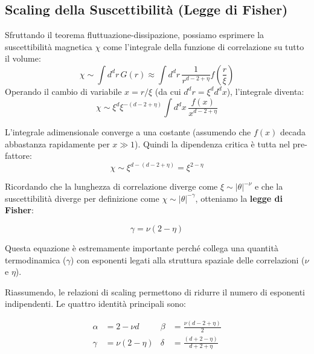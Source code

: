 \subsection{Scaling della Suscettibilità (Legge di Fisher)}
Sfruttando il teorema fluttuazione-dissipazione, possiamo esprimere la suscettibilità magnetica $\chi$ come l'integrale della funzione di correlazione su tutto il volume:
\begin{equation}
    \chi \sim \int d^d r \, G(r) \approx \int d^d r \, \frac{1}{r^{d-2+\eta}} f\left(\frac{r}{\xi}\right)
\end{equation}
Operando il cambio di variabile $x = r/\xi$ (da cui $d^d r = \xi^d d^d x$), l'integrale diventa:
\begin{equation}
    \chi \sim \xi^d \xi^{-(d-2+\eta)} \int d^d x \, \frac{f(x)}{x^{d-2+\eta}} 
\end{equation}

\noindent L'integrale adimensionale converge a una costante (assumendo che $f (x)$ decada abbastanza
rapidamente per $x \gg 1$). Quindi la dipendenza critica è tutta nel pre-fattore:
\begin{equation}
    \chi \sim \xi^{d - (d-2+\eta)} = \xi^{2-\eta}
\end{equation}

\noindent Ricordando che la lunghezza di correlazione diverge come $\xi \sim |\theta|^{-\nu}$ e che la suscettibilità diverge per definizione come $\chi \sim |\theta|^{-\gamma}$, otteniamo la \textbf{legge di Fisher}:

\begin{tcolorbox}[colback=yellow!25, colframe=yellow!75!orange,  coltitle=black, title=\textbf{Legge di Fisher}]
\begin{equation}
    \gamma = \nu(2-\eta)
\end{equation}
\end{tcolorbox}

\noindent Questa equazione è estremamente importante perché collega una quantità termodinamica ($\gamma$) con esponenti legati alla struttura spaziale delle correlazioni ($\nu$ e $\eta$).

\noindent Riassumendo, le relazioni di scaling permettono di ridurre il numero di esponenti indipendenti. Le quattro identità principali sono:

\begin{tcolorbox}[colback=colorA!10, colframe=colorA, coltitle=white, title=\textbf{Relazioni tra Esponenti Critici}]
\begin{align}
   \alpha &= 2-\nu d & \beta &= \frac{\nu(d-2+\eta)}{2} \\
   \gamma &= \nu(2-\eta) & \delta &= \frac{(d+2-\eta)}{d+2+\eta}
\end{align}
\end{tcolorbox}

